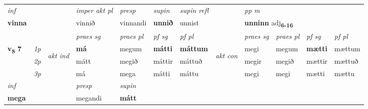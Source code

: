 \begin{longtable}[l]{X>{\footnotesize\itshape}llXXXXlXXXX}
   {\textit{inf}} & &  & \textit{imper akt pl}   & \textit{presp} & \textit{supin} & \textit{supin refl} && \textit{pp m} \\*
  {\textbf{vinna}} & &  & vinnið   & vinnandi &  \textbf{unnið} & unnist && \multicolumn{2}{l}{\textbf{unninn} adj\textbf{\textsubscript{6-16}}} \\*

\midrule

 & &   & \textit{praes sg}  & \textit{praes pl}    & \textit{ pf sg} & \textit{pf pl} & & \textit{praes sg}  & \textit{praes pl}    & \textit{pf sg} & \textit{pf pl }  \\ \cmidrule{4-7} \cmidrule{9-12}
 \multirow{2}{*}{{{\textbf{v{\textsubscript{8}}} \Large{\textbf{7}}}}}  & 1p & \multirow{3}{*}{\begin{turn}{90}\textit{akt ind}\end{turn}} & \textbf{má} & megum & \textbf{mátti} & \textbf{máttum} & \multirow{3}{*}{\begin{turn}{90}\textit{akt con}\end{turn}} &megi & megum & \textbf{mætti} & mættum\\*
 & 2p &  &  mátt  & megið & máttir & máttuð & & megir & megið & mættir & mættuð \\*
 & 3p &  & má & mega & mátti & máttu & & megi & megi& mætti & mættu \\*
\cmidrule{4-7} \cmidrule{9-12}

   {\textit{inf}} & &     & \textit{presp} & \textit{supin}   \\*
  {\textbf{mega}} & &     & megandi &  \textbf{mátt}   \\*


\end{longtable}
